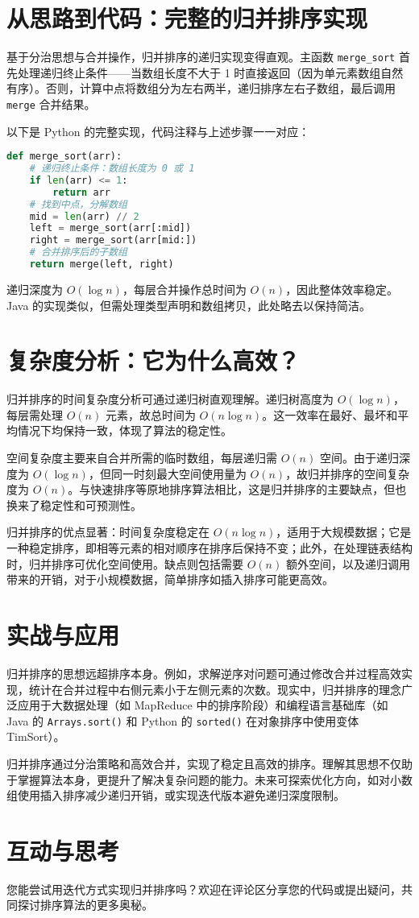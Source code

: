 \chapter{从思路到代码：完整的归并排序实现}
基于分治思想与合并操作，归并排序的递归实现变得直观。主函数 \texttt{merge\_{}sort} 首先处理递归终止条件——当数组长度不大于 1 时直接返回（因为单元素数组自然有序）。否则，计算中点将数组分为左右两半，递归排序左右子数组，最后调用 \texttt{merge} 合并结果。\par
以下是 Python 的完整实现，代码注释与上述步骤一一对应：\par
\begin{lstlisting}[language=python]
def merge_sort(arr):
    # 递归终止条件：数组长度为 0 或 1
    if len(arr) <= 1:
        return arr
    # 找到中点，分解数组
    mid = len(arr) // 2
    left = merge_sort(arr[:mid])
    right = merge_sort(arr[mid:])
    # 合并排序后的子数组
    return merge(left, right)
\end{lstlisting}
递归深度为 $O(\log{n})$，每层合并操作总时间为 $O(n)$，因此整体效率稳定。Java 的实现类似，但需处理类型声明和数组拷贝，此处略去以保持简洁。\par
\chapter{复杂度分析：它为什么高效？}
归并排序的时间复杂度分析可通过递归树直观理解。递归树高度为 $O(\log{n})$，每层需处理 $O(n)$ 元素，故总时间为 $O(n\log{n})$。这一效率在最好、最坏和平均情况下均保持一致，体现了算法的稳定性。\par
空间复杂度主要来自合并所需的临时数组，每层递归需 $O(n)$ 空间。由于递归深度为 $O(\log{n})$，但同一时刻最大空间使用量为 $O(n)$，故归并排序的空间复杂度为 $O(n)$。与快速排序等原地排序算法相比，这是归并排序的主要缺点，但也换来了稳定性和可预测性。\par
归并排序的优点显著：时间复杂度稳定在 $O(n\log{n})$，适用于大规模数据；它是一种稳定排序，即相等元素的相对顺序在排序后保持不变；此外，在处理链表结构时，归并排序可优化空间使用。缺点则包括需要 $O(n)$ 额外空间，以及递归调用带来的开销，对于小规模数据，简单排序如插入排序可能更高效。\par
\chapter{实战与应用}
归并排序的思想远超排序本身。例如，求解逆序对问题可通过修改合并过程高效实现，统计在合并过程中右侧元素小于左侧元素的次数。现实中，归并排序的理念广泛应用于大数据处理（如 MapReduce 中的排序阶段）和编程语言基础库（如 Java 的 \texttt{Arrays.sort()} 和 Python 的 \texttt{sorted()} 在对象排序中使用变体 TimSort）。\par
归并排序通过分治策略和高效合并，实现了稳定且高效的排序。理解其思想不仅助于掌握算法本身，更提升了解决复杂问题的能力。未来可探索优化方向，如对小数组使用插入排序减少递归开销，或实现迭代版本避免递归深度限制。\par
\chapter{互动与思考}
您能尝试用迭代方式实现归并排序吗？欢迎在评论区分享您的代码或提出疑问，共同探讨排序算法的更多奥秘。\par
